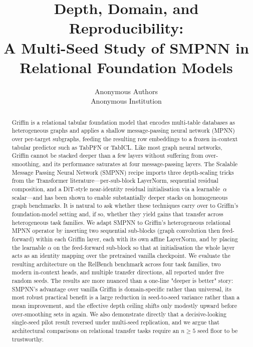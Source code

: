 \documentclass{article}
\title[Depth, Domain, and Reproducibility]{%
  Depth, Domain, and Reproducibility:\\
  A Multi-Seed Study of SMPNN in Relational Foundation Models}
\author[Anonymous]{%
  Anonymous Authors\\
  Anonymous Institution\\
  \email{anonymous@anonymous.org}
}
\begin{document}
\maketitle

\begin{abstract}
Griffin is a relational tabular foundation model that encodes multi-table databases as heterogeneous graphs and applies a shallow message-passing neural network (MPNN) over per-target subgraphs, feeding the resulting row embeddings to a frozen in-context tabular predictor such as TabPFN or TabICL. Like most graph neural networks, Griffin cannot be stacked deeper than a few layers without suffering from over-smoothing, and its performance saturates at four message-passing layers. The Scalable Message Passing Neural Network (SMPNN) recipe imports three depth-scaling tricks from the Transformer literature---per-sub-block LayerNorm, sequential residual composition, and a DiT-style near-identity residual initialisation via a learnable~$\alpha$ scalar---and has been shown to enable substantially deeper stacks on homogeneous graph benchmarks. It is natural to ask whether these techniques carry over to Griffin's foundation-model setting and, if so, whether they yield gains that transfer across heterogeneous task families. We adapt SMPNN to Griffin's heterogeneous relational MPNN operator by inserting two sequential sub-blocks (graph convolution then feed-forward) within each Griffin layer, each with its own affine LayerNorm, and by placing the learnable $\alpha$ on the feed-forward sub-block so that at initialisation the whole layer acts as an identity mapping over the pretrained vanilla checkpoint. We evaluate the resulting architecture on the RelBench benchmark across four task families, two modern in-context heads, and multiple transfer directions, all reported under five random seeds. The results are more nuanced than a one-line "deeper is better" story: SMPNN's advantage over vanilla Griffin is domain-specific rather than universal, its most robust practical benefit is a large reduction in seed-to-seed variance rather than a mean improvement, and the effective depth ceiling shifts only modestly upward before over-smoothing sets in again. We also demonstrate directly that a decisive-looking single-seed pilot result reversed under multi-seed replication, and we argue that architectural comparisons on relational transfer tasks require an $n \ge 5$ seed floor to be trustworthy.
\end{abstract}
\end{document}
